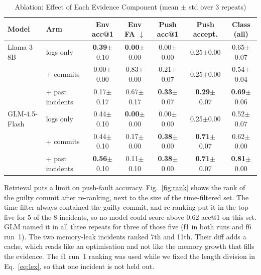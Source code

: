 \documentclass[12pt,onecolumn,draftclsnofoot]{IEEEtran}
\begin{document}
\begin{table}[!t]
\caption{Ablation: Effect of Each Evidence Component (mean $\pm$ std over 3 repeats)}
\label{tab:ablation}
\centering
\footnotesize
\setlength{\tabcolsep}{5pt}
\begin{tabular}{llccccc}
\toprule
\textbf{Model} & \textbf{Arm} & Env acc@1 & Env FA $\downarrow$ & Push acc@1 & Push accept. & Class (all) \\
\midrule
Llama 3 8B & logs only & \textbf{0.39}$\pm$0.10 & \textbf{0.00}$\pm$0.00 & 0.00$\pm$0.00 & 0.25$\pm$0.00 & 0.65$\pm$0.07 \\
 & + commits & 0.00$\pm$0.00 & 0.83$\pm$0.00 & 0.21$\pm$0.07 & 0.25$\pm$0.00 & 0.54$\pm$0.04 \\
 & + past incidents & 0.17$\pm$0.17 & 0.67$\pm$0.17 & \textbf{0.33}$\pm$0.07 & \textbf{0.29}$\pm$0.07 & \textbf{0.69}$\pm$0.06 \\
\midrule
GLM-4.5-Flash & logs only & 0.44$\pm$0.10 & \textbf{0.00}$\pm$0.00 & 0.00$\pm$0.00 & 0.25$\pm$0.00 & 0.52$\pm$0.07 \\
 & + commits & 0.44$\pm$0.10 & 0.17$\pm$0.00 & \textbf{0.38}$\pm$0.00 & \textbf{0.71}$\pm$0.07 & 0.62$\pm$0.00 \\
 & + past incidents & \textbf{0.56}$\pm$0.10 & 0.11$\pm$0.10 & \textbf{0.38}$\pm$0.00 & \textbf{0.71}$\pm$0.07 & \textbf{0.81}$\pm$0.00 \\
\bottomrule
\end{tabular}
\end{table}

Retrieval puts a limit on push-fault accuracy. Fig.~\ref{fig:rank} shows the rank of the guilty commit after re-ranking, next to the size of the time-filtered set. The time filter always contained the guilty commit, and re-ranking put it in the top five for 5 of the 8 incidents, so no model could score above 0.62 acc@1 on this set. GLM named it in all three repeats for three of those five (f1 in both runs and f6 run~1). The two memory-leak incidents ranked 7th and 11th. Their diff adds a cache, which reads like an optimisation and not like the memory growth that fills the evidence. The f1 run~1 ranking was used while we fixed the length division in Eq.~\eqref{eq:lex}, so that one incident is not held out.
\end{document}
